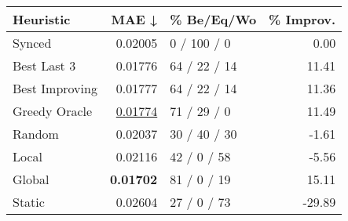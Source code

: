 \begin{tabular}{lrlr}
\toprule
\textbf{Heuristic} & \textbf{MAE ↓} & \textbf{\% Be/Eq/Wo} & \textbf{\% Improv.} \\
\midrule
            Synced &        0.02005 &          0 / 100 / 0 &                0.00 \\
\midrule
       Best Last 3 &        0.01776 &         64 / 22 / 14 &               11.41 \\
    Best Improving &        0.01777 &         64 / 22 / 14 &               11.36 \\
\addlinespace
     Greedy Oracle &        \underline{0.01774} &          71 / 29 / 0 &               11.49 \\
            Random &        0.02037 &         30 / 40 / 30 &               -1.61 \\
\midrule
             Local &        0.02116 &          42 / 0 / 58 &               -5.56 \\
            Global &        \textbf{0.01702} &          81 / 0 / 19 &               15.11 \\
\midrule
            Static &        0.02604 &          27 / 0 / 73 &              -29.89 \\
\bottomrule
\end{tabular}

\label{tab:non_lr05_le2_bs4_Summary}
